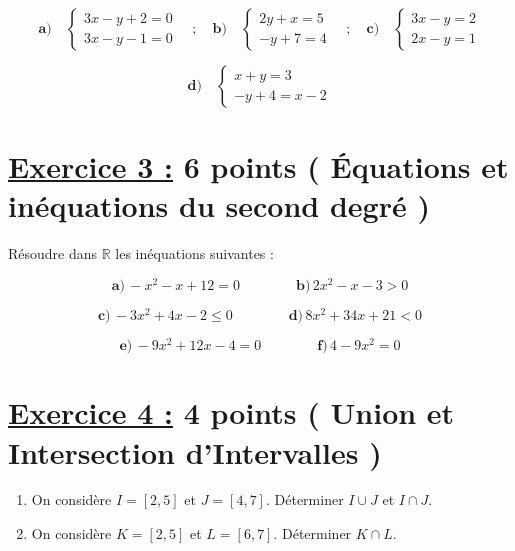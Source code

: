 \documentclass[12pt,a4paper]{article}
\begin{document}
\[
\textbf{a)} \quad
\begin{cases}
3x - y + 2 = 0 \\
3x - y - 1 = 0
\end{cases}
\quad ; \quad
\textbf{b)} \quad
\begin{cases}
2y + x = 5 \\
-y + 7 = 4
\end{cases}
\quad ; \quad
\textbf{c)} \quad
\begin{cases}
3x - y = 2 \\
2x - y = 1
\end{cases}
\]

\[
\textbf{d)} \quad
\begin{cases}
x + y = 3 \\
-y + 4 = x - 2
\end{cases}
\]

\section*{\underline{Exercice 3 :} 6 points ( Équations et inéquations du second degré )}

Résoudre dans \(\mathbb{R}\) les inéquations suivantes :

\[
\textbf{a)} \, -x^2 - x + 12 = 0 \quad\quad \quad\quad\textbf{b)} \, 2x^2 - x - 3 > 0
\]

\[
\textbf{c)} \, -3x^2 + 4x - 2 \leq 0 \quad\quad\quad\quad \textbf{d)} \, 8x^2 + 34x + 21 < 0
\]

\[
\textbf{e)} \, -9x^2 + 12x - 4 = 0 \quad\quad\quad\quad \textbf{f)} \, 4 - 9x^2 =0
\]
\section*{\underline{Exercice 4 :} 4 points ( Union et Intersection d'Intervalles )}  

\begin{enumerate}  
\item On considère \( I = [2, 5] \) et \( J = [4, 7] \). Déterminer \( I \cup J \) et \( I \cap J \).  

\item On considère \( K = [2, 5] \) et \( L = [6, 7] \). Déterminer \( K \cap L \).  
\end{enumerate}
\end{document}
